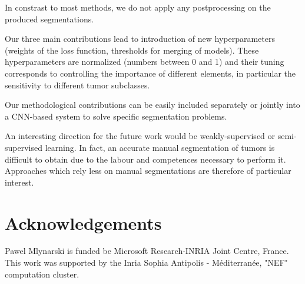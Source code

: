 \documentclass[preprint,12pt]{elsarticle}
\begin{document}
In constrast to most methods, we do not apply any postprocessing on the produced segmentations.


Our three main contributions lead to introduction of new hyperparameters (weights of the loss function, thresholds for merging of models). These hyperparameters are normalized (numbers between 0 and 1) and their tuning corresponds to controlling the importance of different elements, in particular the sensitivity to different tumor subclasses.


Our methodological contributions can be easily included separately or jointly into a CNN-based system to solve specific segmentation problems.


An interesting direction for the future work would be weakly-supervised or semi-supervised learning. In fact, an accurate manual segmentation of tumors is difficult to obtain due to the labour and competences necessary to perform it. Approaches which rely less on manual segmentations are therefore of particular interest.




\section*{Acknowledgements}
Pawel Mlynarski is funded be Microsoft Research-INRIA Joint Centre, France. This work was supported by the Inria Sophia Antipolis - M\'editerran\'ee, "NEF" computation cluster.













 

\end{document}
